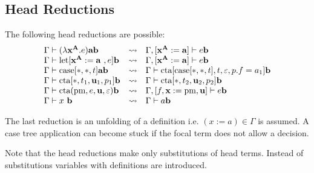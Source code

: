 \subsection{Head Reductions}

The following head reductions are possible:
$$
\begin{array}{llll}
        \Gamma \vdash (\lambda \vec x^{\vec A}. e) \vec a \vec b
        &\reduce&
        \Gamma, [\vec x^{\vec A} := \vec a] \vdash e \vec b
        \\
        \Gamma \vdash \llet[\vec x^{\vec A} := \vec a , e] \vec b
        &\reduce&
        \Gamma, [\vec x^{\vec A} := \vec a] \vdash e \vec b
        \\
        \Gamma \vdash \case[*, *, t] \vec a \vec b
        &\reduce&
        \Gamma \vdash \cta[\case[*,*,t], t, \empty, p.f = a_1] \vec b
        \\
        \Gamma \vdash \cta[*, t_1, \vec u_1, p_1] \vec b
        &\reduce&
        \Gamma \vdash \cta[*, t_2, \vec u_2, p_2] \vec b
        \\
        \Gamma
        \vdash
        \cta(\text{pm}, e, \vec u, \empty) \vec b
        &\reduce&
        \Gamma, [f,\vec x := \text{pm}, \vec u]
        \vdash
        e \vec b
        \\
        \Gamma \vdash x \vec b
        &\reduce&
        \Gamma \vdash a \vec b
\end{array}
$$

The last reduction is an unfolding of a definition i.e. $(x:=a) \in \Gamma$ is
assumed. A case tree application can become stuck if the focal term does not
allow a decision.

Note that the head reductions make only substitutions of head terms. Instead of
substitutions variables with definitions are introduced.
